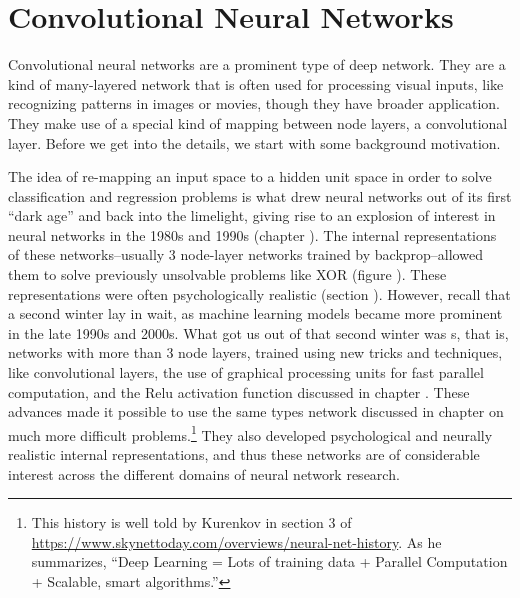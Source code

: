 \chapter{Convolutional Neural Networks}\label{ch_cnn}



Convolutional neural networks are a prominent type of deep network. They are a kind of many-layered network that is often used for processing visual inputs, like recognizing patterns in images or movies, though they have broader application. They make use of a special kind of mapping between node layers, a convolutional layer. Before we get into the details, we start with some background motivation.

The idea of re-mapping an input space to a hidden unit space in order to solve classification and regression problems is what drew neural networks out of its first ``dark age'' and back into the limelight, giving rise to an explosion of interest in neural networks in the 1980s and 1990s (chapter ). The internal representations of these networks--usually 3 node-layer networks trained by backprop--allowed them to solve previously unsolvable problems like XOR (figure ). These representations were often psychologically realistic (section ). However, recall that a second  winter lay in wait, as machine learning models became more prominent in the late 1990s and 2000s. What got us out of that second winter was s, that is, networks with more than 3 node layers, trained using new tricks and techniques, like convolutional layers, the use of graphical processing units for fast parallel computation, and the Relu activation function discussed in chapter . These advances made it possible to use the same types network discussed in chapter  on much more difficult problems.\footnote{This history is well told by Kurenkov in section 3 of \url{https://www.skynettoday.com/overviews/neural-net-history}. As he summarizes, ``Deep Learning = Lots of training data + Parallel Computation + Scalable, smart algorithms.''}  They also developed psychological and neurally realistic internal representations, and thus these networks are of considerable interest across the different domains of neural network research.

